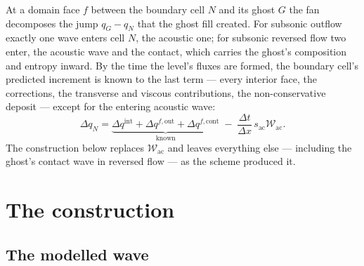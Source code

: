 \documentclass[11pt,a4paper]{article}
\newcommand{\W}{\mathcal{W}}
\begin{document}
At a domain face $f$ between the boundary cell $N$ and its ghost $G$
the fan decomposes the jump $q_G - q_N$ that the ghost fill created.  For
subsonic outflow exactly one wave enters cell $N$, the acoustic one; for
subsonic reversed flow two enter, the acoustic wave and the contact,
which carries the ghost's composition and entropy inward.  By the time
the level's fluxes are formed, the boundary cell's predicted increment
is known to the last term --- every interior face, the corrections, the
transverse and viscous contributions, the non-conservative deposit ---
except for the entering acoustic wave:
\begin{equation}
  \Delta q_N = \underbrace{\Delta q^{\mathrm{int}} + \Delta q^{f,\mathrm{out}} + \Delta q^{f,\mathrm{cont}}}_{\text{known}}
  \;-\; \frac{\Delta t}{\Delta x}\, s_{\mathrm{ac}} \W_{\mathrm{ac}} .
  \label{eq:split}
\end{equation}
The construction below replaces $\W_{\mathrm{ac}}$ and leaves everything
else --- including the ghost's contact wave in reversed flow --- as the
scheme produced it.

\section{The construction}

\subsection{The modelled wave}
\end{document}
